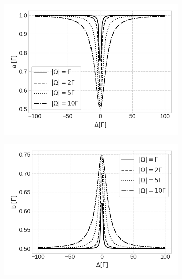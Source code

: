 {\begin{figure}[H]
	\begin{subfigure}[t]{0.48\textwidth}
		\centering
		\includegraphics[width=1.0\textwidth]{USPSC-img/damping_coefficient_a.png}
	\label{fig:damping-coefficient-a}
	\end{subfigure}
	\hfill
	\begin{subfigure}[t]{0.48\textwidth}
		\centering
		\includegraphics[width=1.0\textwidth]{USPSC-img/damping_coefficient_b.png}
		\label{fig:damping-coefficient-b}
	\end{subfigure}


\end{figure}}
